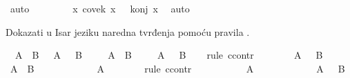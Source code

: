 \begin{isabellebody}
\begin{exercise}[subtitle=Isar dokazi u logici prvog reda.]
\ auto\isanewline
\ \ \ \ \isamarkupfalse%
\ \isamarkupfalse%
\ {\isachardoublequoteopen}{\isasymexists}\ x{\isachardot}{\kern0pt}\ covek\ x\ {\isasymand}\ {\isasymnot}\ konj\ x{\isachardoublequoteclose}\ \isamarkupfalse%
\ auto\isanewline
\ \ \isamarkupfalse%
\isanewline
{}\isamarkupfalse%
%
\endisatagproof
{\isafoldproof}%
%
\isadelimproof
%
\endisadelimproof
%
\end{exercise}
%
\begin{exercise}[subtitle=Pravilo ccontr i classical.]
%
\begin{isamarkuptext}%
Dokazati u Isar jeziku naredna tvrđenja pomoću pravila .%
\end{isamarkuptext}\isamarkuptrue%
\isamarkupfalse%
\ {\isachardoublequoteopen}{\isasymnot}\ {\isacharparenleft}{\kern0pt}A\ {\isasymand}\ B{\isacharparenright}{\kern0pt}\ {\isasymlongrightarrow}\ {\isasymnot}\ A\ {\isasymor}\ {\isasymnot}\ B{\isachardoublequoteclose}\isanewline
%
\isadelimproof
%
\endisadelimproof
%
\isatagproof
{}\isamarkupfalse%
\isanewline
\ \ \isamarkupfalse%
\ {\isachardoublequoteopen}{\isasymnot}\ {\isacharparenleft}{\kern0pt}A\ {\isasymand}\ B{\isacharparenright}{\kern0pt}{\isachardoublequoteclose}\isanewline
\ \ \isamarkupfalse%
\ {\isachardoublequoteopen}{\isasymnot}\ A\ {\isasymor}\ {\isasymnot}\ B{\isachardoublequoteclose}\isanewline
\ \ \isamarkupfalse%
\ {\isacharparenleft}{\kern0pt}rule\ ccontr{\isacharparenright}{\kern0pt}\isanewline
\ \ \ \ \isamarkupfalse%
\ {\isachardoublequoteopen}{\isasymnot}\ {\isacharparenleft}{\kern0pt}{\isasymnot}\ A\ {\isasymor}\ {\isasymnot}\ B{\isacharparenright}{\kern0pt}{\isachardoublequoteclose}\isanewline
\ \ \ \ \isamarkupfalse%
\ {\isachardoublequoteopen}A\ {\isasymand}\ B{\isachardoublequoteclose}\isanewline
\ \ \ \ \isamarkupfalse%
\isanewline
\ \ \ \ \ \ \isamarkupfalse%
\ A\isanewline
\ \ \ \ \ \ \isamarkupfalse%
\ {\isacharparenleft}{\kern0pt}rule\ ccontr{\isacharparenright}{\kern0pt}\isanewline
\ \ \ \ \ \ \ \ \isamarkupfalse%
\ {\isachardoublequoteopen}{\isasymnot}\ A{\isachardoublequoteclose}\isanewline
\ \ \ \ \ \ \ \ \isamarkupfalse%
\ \isamarkupfalse%
\ {\isachardoublequoteopen}{\isasymnot}\ A\ {\isasymor}\ {\isasymnot}\ B{\isachardoublequoteclose}\ \isanewline
\ \ \ \ \ \ \ \ \ \ \isamarkupfalse%

\end{exercise}
\end{isabellebody}
